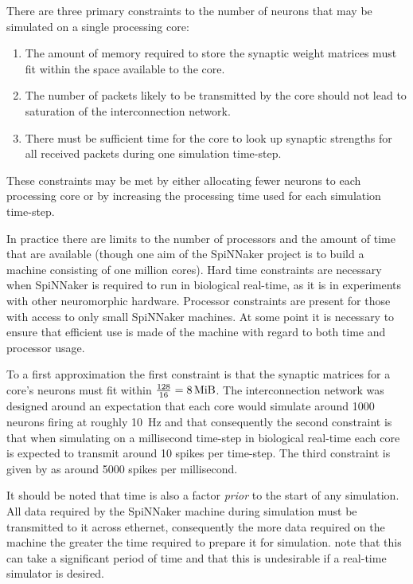 \documentclass[conference]{IEEEtran}
\begin{document}
  There are three primary constraints to the number of neurons that may be
  simulated on a single processing core:

  \begin{enumerate}
    \item The amount of memory required to store the synaptic weight matrices
      must fit within the space available to the core.
    \item The number of packets likely to be transmitted by the core should not
      lead to saturation of the interconnection network.
    \item There must be sufficient time for the core to look up synaptic
      strengths for all received packets during one simulation time-step.
  \end{enumerate}

  These constraints may be met by either allocating fewer neurons to each
  processing core or by increasing the processing time used for each simulation
  time-step.
  
  In practice there are limits to the number of processors and the amount of
  time that are available (though one aim of the SpiNNaker project is to build
  a machine consisting of one million cores).  Hard time constraints are
  necessary when SpiNNaker is required to run in biological real-time, as it is
  in experiments with other neuromorphic hardware.  Processor constraints are
  present for those with access to only small SpiNNaker machines.  At some
  point it is necessary to ensure that efficient use is made of the machine
  with regard to both time and processor usage.

  To a first approximation the first constraint is that the synaptic matrices
  for a core's neurons must fit within $\frac{128}{16} = \SI{8}{\mebi\byte}$.
  The interconnection network was designed around an expectation that each core
  would simulate around \num{1000} neurons firing at roughly \SI{10}{\hertz}
  and that consequently the second constraint is that when simulating on a
  millisecond time-step in biological real-time each core is expected to
  transmit around 10 spikes per time-step.  The third constraint is given by
  \textcite[\S III.C]{Sharp2013} as around \num{5000} spikes per millisecond.

  It should be noted that time is also a factor \textit{prior} to the start of
  any simulation.  All data required by the SpiNNaker machine during simulation
  must be transmitted to it across ethernet, consequently the more data
  required on the machine the greater the time required to prepare it for
  simulation.  \textcite{Sharp2013} note that this can take a significant
  period of time and that this is undesirable if a real-time simulator is
  desired.
\end{document}
